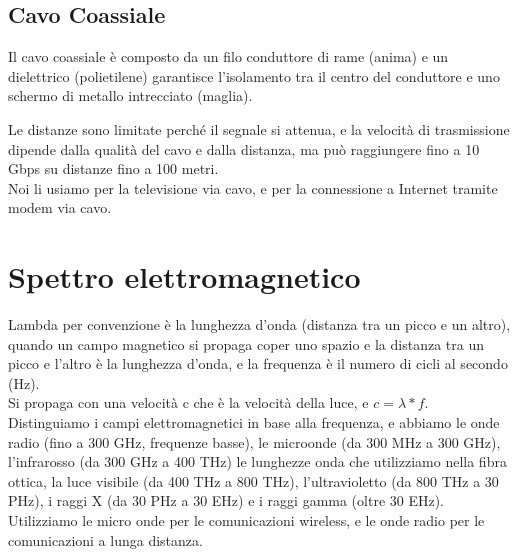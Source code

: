 \subsection{Cavo Coassiale}
Il cavo coassiale è composto da un filo conduttore di rame (anima) e un dielettrico (polietilene) garantisce 
l'isolamento tra il centro del conduttore e uno schermo di metallo intrecciato (maglia).

Le distanze sono limitate perché il segnale si attenua, e la velocità di trasmissione dipende dalla qualità del cavo e dalla distanza, ma può raggiungere fino a 10 Gbps su distanze fino a 100 metri.\\
Noi li usiamo per la televisione via cavo, e per la connessione a Internet tramite modem via cavo.\\

\section{Spettro elettromagnetico}
Lambda per convenzione è la lunghezza d'onda (distanza tra un picco e un altro), quando un campo magnetico si propaga coper
uno spazio e la distanza tra un picco e l'altro è la lunghezza d'onda, e la frequenza è il numero di cicli al secondo (Hz).\\

Si propaga con una velocità c che è la velocità della luce, e $c = \lambda * f.$\\
Distinguiamo i campi elettromagnetici in base alla frequenza, e abbiamo le onde radio (fino a 300 GHz, frequenze basse), le microonde (da 300 MHz a 300 GHz), 
l'infrarosso (da 300 GHz a 400 THz) le lunghezze onda che utilizziamo nella fibra ottica, la luce visibile (da 400 THz a 800 THz), 
l'ultravioletto (da 800 THz a 30 PHz), i raggi X (da 30 PHz a 30 EHz) e i raggi gamma (oltre 30 EHz).\\

Utilizziamo le micro onde per le comunicazioni wireless, e le onde radio per le comunicazioni a lunga distanza.\\

